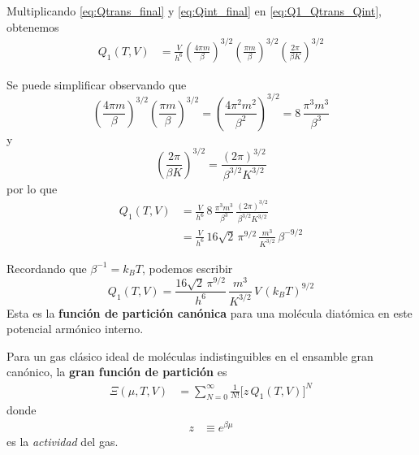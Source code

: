 \documentclass{article}
\begin{document}
Multiplicando \eqref{eq:Qtrans_final} y \eqref{eq:Qint_final} en
\eqref{eq:Q1_Qtrans_Qint}, obtenemos
\begin{equation}
\begin{split}
Q_{1}(T,V)
&= \frac{V}{h^{6}}
\left(\frac{4\pi m}{\beta}\right)^{3/2}
\left(\frac{\pi m}{\beta}\right)^{3/2}
\left(\frac{2\pi}{\beta K}\right)^{3/2}
\end{split}\label{eq:Q1_paso}
\end{equation}

Se puede simplificar observando que
\[
\left(\frac{4\pi m}{\beta}\right)^{3/2}
\left(\frac{\pi m}{\beta}\right)^{3/2}
= \left(\frac{4\pi^{2}m^{2}}{\beta^{2}}\right)^{3/2}
= 8\,\frac{\pi^{3}m^{3}}{\beta^{3}}
\]
y
\[
\left(\frac{2\pi}{\beta K}\right)^{3/2}
= \frac{(2\pi)^{3/2}}{\beta^{3/2}K^{3/2}}
\]
por lo que
\begin{equation}
\begin{split}
Q_{1}(T,V)
&= \frac{V}{h^{6}}\,
8\,\frac{\pi^{3}m^{3}}{\beta^{3}}\,
\frac{(2\pi)^{3/2}}{\beta^{3/2}K^{3/2}} \\[4pt]
&= \frac{V}{h^{6}}\,
16\sqrt{2}\,\pi^{9/2}\,\frac{m^{3}}{K^{3/2}}\,\beta^{-9/2}
\end{split}\label{eq:Q1_beta}
\end{equation}

Recordando que \(\beta^{-1}=k_{B}T\), podemos escribir
\begin{equation}
\boxed{
Q_{1}(T,V)
= \frac{16\sqrt{2}\,\pi^{9/2}}{h^{6}}
\,\frac{m^{3}}{K^{3/2}}\,
V\,(k_{B}T)^{9/2}
}
\label{eq:Q1_final}
\end{equation}
Esta es la \textcolor{Cinnabar}{\textbf{función de partición canónica}} para una molécula diatómica en
este potencial armónico interno.


Para un gas clásico ideal de moléculas indistinguibles en el ensamble gran
canónico, la \textcolor{Cinnabar}{\textbf{gran función de partición}} es
\begin{equation}
\begin{split}
\Xi(\mu,T,V)
&= \sum_{N=0}^{\infty}
\frac{1}{N!}\big[z\,Q_{1}(T,V)\big]^{N}
\end{split}\label{eq:Xi_def_prob3}
\end{equation}
donde
\begin{equation}
\begin{split}
z &\equiv e^{\beta\mu}
\end{split}\label{eq:def_z_prob3}
\end{equation}
es la \emph{actividad} del gas.
\end{document}
